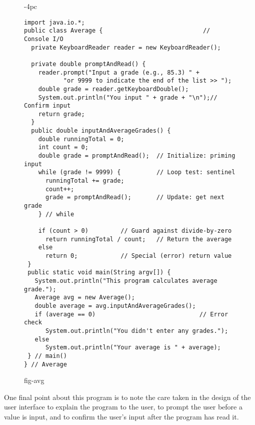 \begin{figure}[h!]
\jjjprogstart
\begin{jjjlistingleft}[30pc]{-4pc}
\begin{lstlisting}
import java.io.*;
public class Average {                            // Console I/O
  private KeyboardReader reader = new KeyboardReader();  

  private double promptAndRead() {
    reader.prompt("Input a grade (e.g., 85.3) " +
           "or 9999 to indicate the end of the list >> ");
    double grade = reader.getKeyboardDouble();
    System.out.println("You input " + grade + "\n");// Confirm input
    return grade;
  }
  public double inputAndAverageGrades() {
    double runningTotal = 0;
    int count = 0;
    double grade = promptAndRead();  // Initialize: priming input
    while (grade != 9999) {          // Loop test: sentinel
      runningTotal += grade;                            
      count++;                                          
      grade = promptAndRead();       // Update: get next grade
    } // while

    if (count > 0)         // Guard against divide-by-zero
      return runningTotal / count;   // Return the average
    else
      return 0;            // Special (error) return value
 }
 public static void main(String argv[]) {
   System.out.println("This program calculates average grade."); 
   Average avg = new Average();
   double average = avg.inputAndAverageGrades();
   if (average == 0)                             // Error check
      System.out.println("You didn't enter any grades.");
   else
      System.out.println("Your average is " + average);        
 } // main()
} // Average
\end{lstlisting}
\end{jjjlistingleft}
{fig-avg}
\end{figure}

One final point about this program is to note the care taken in the
design of the user interface to explain the program to the user, to
prompt the user before a value is input, and to confirm the user's
input after the program has read it.


